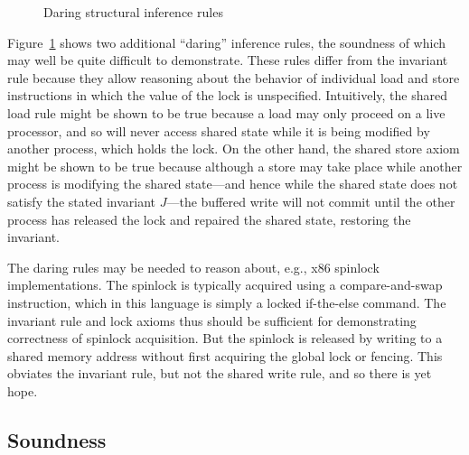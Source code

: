 \documentclass[11pt]{report}
\begin{document}
\begin{figure}[ht]
	\centering
	\caption{\label{fig:daring-structural-inference-rules}Daring structural inference rules}
\end{figure} 

Figure~\ref{fig:daring-structural-inference-rules} shows two additional ``daring'' inference rules, the soundness of which may well be quite difficult to demonstrate. These rules differ from the invariant rule because they allow reasoning about the behavior of individual load and store instructions in which the value of the lock is unspecified. Intuitively, the shared load rule might be shown to be true because a load may only proceed on a live processor, and so will never access shared state while it is being modified by another process, which holds the lock. On the other hand, the shared store axiom might be shown to be true because although a store may take place while another process is modifying the shared state---and hence while the shared state does not satisfy the stated invariant $J$---the buffered write will not commit until the other process has released the lock and repaired the shared state, restoring the invariant.

The daring rules may be needed to reason about, e.g., x86 spinlock implementations. The spinlock is typically acquired using a compare-and-swap instruction, which in this language is simply a locked if-the-else command. The invariant rule and lock axioms thus should be sufficient for demonstrating correctness of spinlock acquisition. But the spinlock is released by writing to a shared memory address without first acquiring the global lock or fencing. This obviates the invariant rule, but not the shared write rule, and so there is yet hope. 

\subsection{Soundness}
\end{document}
